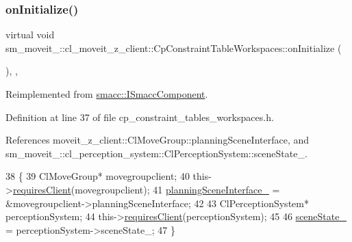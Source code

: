 \subsubsection{\texorpdfstring{on\+Initialize()}{onInitialize()}}
{\footnotesize\ttfamily virtual void sm\+\_\+moveit\+\_\+::cl\+\_\+moveit\+\_\+z\+\_\+client\+::\+Cp\+Constraint\+Table\+Workspaces\+::on\+Initialize (\begin{DoxyParamCaption}{ }\end{DoxyParamCaption})\hspace{0.3cm}{\ttfamily [inline]}, {\ttfamily [override]}, {\ttfamily [virtual]}}



Reimplemented from \hyperlink{classsmacc_1_1ISmaccComponent_ae6f71d008db12553912e9436184b9e65}{smacc\+::\+I\+Smacc\+Component}.



Definition at line 37 of file cp\+\_\+constraint\+\_\+tables\+\_\+workspaces.\+h.



References moveit\+\_\+z\+\_\+client\+::\+Cl\+Move\+Group\+::planning\+Scene\+Interface, and sm\+\_\+moveit\+\_\+::cl\+\_\+perception\+\_\+system\+::\+Cl\+Perception\+System\+::scene\+State\+\_\+.


\begin{DoxyCode}
38             \{
39                 ClMoveGroup* movegroupclient;
40                 this->\hyperlink{classsmacc_1_1ISmaccComponent_a36c085d906fbae0fcaee817aaeafebf4}{requiresClient}(movegroupclient);
41                 \hyperlink{classsm__moveit__4_1_1cl__moveit__z__client_1_1CpConstraintTableWorkspaces_a24d96bcde58af9e8aacbb4737859ac95}{planningSceneInterface\_} = &movegroupclient->planningSceneInterface;
42 
43                 ClPerceptionSystem* perceptionSystem;
44                 this->\hyperlink{classsmacc_1_1ISmaccComponent_a36c085d906fbae0fcaee817aaeafebf4}{requiresClient}(perceptionSystem);
45 
46                 \hyperlink{classsm__moveit__4_1_1cl__moveit__z__client_1_1CpConstraintTableWorkspaces_ae2d0e4852e944e8a870d5936de646d47}{sceneState\_} = perceptionSystem->sceneState\_;
47             \}
\end{DoxyCode}
\mbox{\label{classsm__moveit__4_1_1cl__moveit__z__client_1_1CpConstraintTableWorkspaces_aa486721739e624c29765c61b6ea69908}} 
